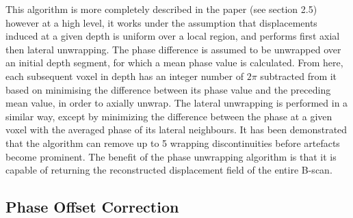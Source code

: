 This algorithm is more completely described in the paper \cite{kennedy_optical_2014} (see section 2.5) however at a high level, it works under the assumption that displacements induced at a given depth is uniform over a local region, and performs first axial then lateral unwrapping. The phase difference is assumed to be unwrapped over an initial depth segment, for which a mean phase value is calculated. From here, each subsequent voxel in depth has an integer number of $2\pi$ subtracted from it based on minimising the difference between its phase value and the preceding mean value, in order to axially unwrap. The lateral unwrapping is performed in a similar way, except by minimizing the difference between the phase at a given voxel with the averaged phase of its lateral neighbours. It has been demonstrated that the algorithm can remove up to 5 wrapping discontinuities \cite{kennedy_optical_2014} before artefacts become prominent. The benefit of the phase unwrapping algorithm is that it is capable of returning the reconstructed displacement field of the entire B-scan. 

\subsection{Phase Offset Correction}

